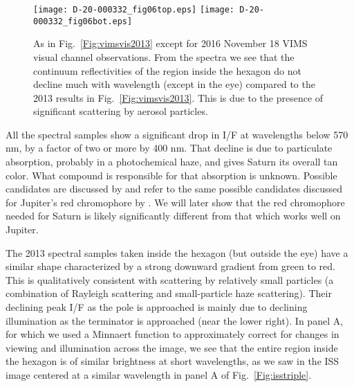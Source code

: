 \documentclass[article,11pt]{emulateapj}
\begin{document}
\begin{figure*}[!ht]
\texttt{[image: D-20-000332\_fig06top.eps]}
\texttt{[image: D-20-000332\_fig06bot.eps]}
\caption{As in Fig.\ \ref{Fig:vimsvis2013} except for 2016 November 18
  VIMS visual channel observations. From the spectra we see that the
continuum reflectivities of the region inside the hexagon do not decline
much with wavelength (except in the eye) compared to the 2013 results
in Fig.\ \ref{Fig:vimsvis2013}. This is due to the presence of significant
scattering by aerosol particles.}
\label{Fig:vimsvis2016}
\end{figure*}

All the spectral samples show a significant drop
in I/F at wavelengths below 570 nm, by a factor of two or more by 400
nm.  That decline is due to particulate absorption, probably in a
photochemical haze, and gives Saturn its overall tan color.  What
compound is responsible for that absorption is unknown. Possible
candidates are discussed by \cite{West2009satbook} and refer
to the same possible candidates discussed for Jupiter's red chromophore
by \cite{West1986}. We will later show that the red chromophore needed
for Saturn is likely significantly different from that which works
well on Jupiter.

The 2013 spectral samples taken inside the hexagon (but outside the eye) have a similar shape
characterized by a strong downward gradient from green to red.  This is
qualitatively consistent with scattering by relatively small particles (a combination
of Rayleigh scattering and small-particle haze scattering).  Their declining
peak I/F as the pole is approached is mainly due to declining illumination as
the terminator is approached (near the lower right).  In panel A, for which we used
a Minnaert function to approximately correct for changes in viewing and illumination
across the image, we see that the entire region inside the hexagon is of similar brightness
at short wavelengths, as we saw in the ISS image centered at a similar wavelength
in panel A of Fig.\ \ref{Fig:isstriple}.  
\end{document}
